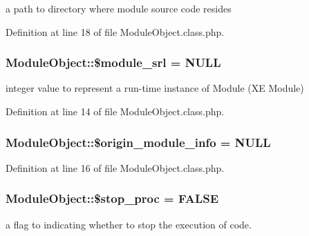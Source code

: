 a path to directory where module source code resides 



Definition at line 18 of file Module\-Object.\-class.\-php.

\hypertarget{classModuleObject_a0da50016ddc31513f563206fdf6f413d}{
\subsubsection[{\$module\-\_\-srl}]{\setlength{\rightskip}{0pt plus 5cm}Module\-Object\-::\$module\-\_\-srl = N\-U\-L\-L}}\label{classModuleObject_a0da50016ddc31513f563206fdf6f413d}


integer value to represent a run-\/time instance of Module (X\-E Module) 



Definition at line 14 of file Module\-Object.\-class.\-php.

\hypertarget{classModuleObject_a6bdf7982a5defc9d618c2dd1b700e876}{
\subsubsection[{\$origin\-\_\-module\-\_\-info}]{\setlength{\rightskip}{0pt plus 5cm}Module\-Object\-::\$origin\-\_\-module\-\_\-info = N\-U\-L\-L}}\label{classModuleObject_a6bdf7982a5defc9d618c2dd1b700e876}


Definition at line 16 of file Module\-Object.\-class.\-php.

\hypertarget{classModuleObject_ad4efa1b4c623247763e4d56f76c5fb1c}{
\subsubsection[{\$stop\-\_\-proc}]{\setlength{\rightskip}{0pt plus 5cm}Module\-Object\-::\$stop\-\_\-proc = F\-A\-L\-S\-E}}\label{classModuleObject_ad4efa1b4c623247763e4d56f76c5fb1c}


a flag to indicating whether to stop the execution of code. 



